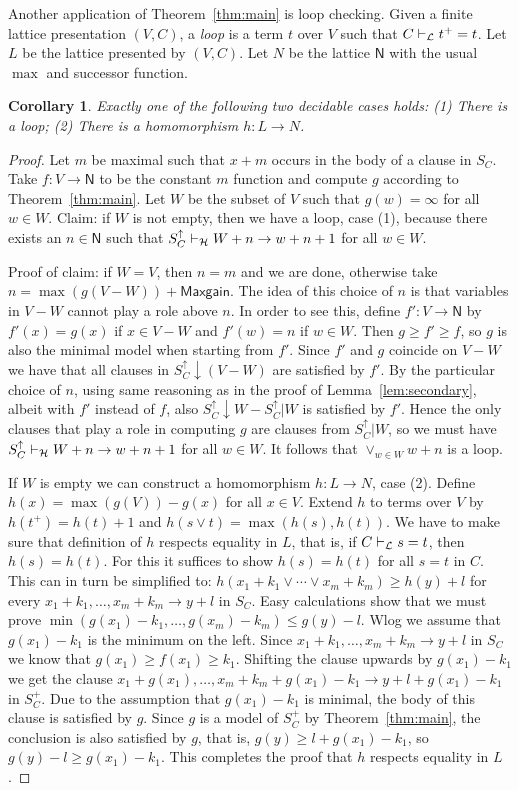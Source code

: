 \documentclass[11pt,a4paper]{article}
\newtheorem{corollary}[theorem]{Corollary}
\newcommand{\N}{\mathsf{N}}
\newcommand\jterm[3]{{{#1_1}+{#2_1}}\vee\cdots\vee{{#1_#3}+{#2_#3}}}
\newcommand\jbody[3]{{{#1_1}+{#2_1}},\ldots,{{#1_#3}+{#2_#3}}}
\newcommand\lathy{{\cal L}}
\newcommand\prvL{\vdash_{\lathy}}
\newcommand\prvH{\vdash_{\cal H}}
\newcommand\M{\mathsf{Maxgain}}
\begin{document}
Another application of Theorem~\ref{thm:main} is loop checking.
Given a finite lattice presentation $(V,C)$, a \emph{loop} is a 
term $t$ over $V$ such that $C\prvL t^+=t$. Let $L$ be the
lattice presented by $(V,C)$. Let $N$ be the lattice $\N$ with
the usual $\max$ and successor function.

\begin{corollary}\label{cor:loopchecking}
Exactly one of the following two decidable cases holds:
(1) There is a loop;
(2) There is a homomorphism $h: L\to N$.
\end{corollary}
\begin{proof}
Let $m$ be maximal such that $x+m$ occurs in the body of a clause in $S_C$.
Take $f: V\to\N$ to be the constant $m$ function and compute $g$ according
to Theorem~\ref{thm:main}. Let $W$ be the subset of $V$ such that 
$g(w)=\infty$ for all $w\in W$. Claim: if $W$ is not empty,
then we have a loop, case (1), because there exists an $n\in\N$ such that 
$S^\uparrow_C\prvH W+n \to w+n+1$ for all $w\in W$.

Proof of claim: if $W=V$, then $n=m$ and we are done,
otherwise take $n= \max(g(V-W))+\M$. The idea of this choice of $n$ is 
that variables in $V-W$ cannot play a role above $n$.
In order to see this, define $f': V\to\N$ by $f'(x)=g(x)$ if $x\in V-W$
and $f'(w)=n$ if $w\in W$. Then $g\geq f'\geq f$, so $g$ is also the minimal 
model when starting from $f'$. Since $f'$ and $g$ coincide on $V-W$ we have
that all clauses in $S^\uparrow_C{\downarrow}(V-W)$ are satisfied by $f'$.
By the particular choice of $n$, using same reasoning as in the proof of 
Lemma~\ref{lem:secondary}, albeit with $f'$ instead of $f$, also
$S^\uparrow_C{\downarrow}W - S^\uparrow_C|W$ is satisfied by $f'$.
Hence the only clauses that play a role in computing $g$ are
clauses from $S^\uparrow_C|W$, so we must have 
$S^\uparrow_C\prvH W+n \to w+n+1$ for all $w\in W$.
It follows that $\vee_{w\in W} w+n$ is a loop.

If $W$ is empty we can construct a homomorphism $h: L\to N$, case (2).
Define $h(x) = \max(g(V))- g(x)$ for all $x\in V$. 
Extend $h$ to terms over $V$ by $h(t^+) = h(t)+1$ 
and $h(s\vee t) = \max(h(s),h(t))$.
We have to make sure that definition of $h$ respects
equality in $L$, that is, if $C\prvL s=t$, then $h(s)=h(t)$.
For this it suffices to show $h(s)=h(t)$ for all $s=t$ in $C$.
This can in turn be simplified to: $h(\jterm{x}{k}{m}) \geq h(y)+l$ 
for every $\jbody{x}{k}{m} \to y+l$ in $S_C$.
Easy calculations show that we must prove
$\min(g(x_1)-k_1,\ldots,g(x_m)-k_m) \leq g(y)-l$.
Wlog we assume that $g(x_1)-k_1$ is the minimum on the left.
Since $\jbody{x}{k}{m} \to y+l$ in $S_C$ we know 
that $g(x_1)\geq f(x_1)\geq k_1$. Shifting the clause
upwards by $g(x_1)-k_1$ we get the clause
$x_1+g(x_1),\ldots,x_m+k_m+g(x_1)-k_1 \to y+l+g(x_1)-k_1$
in $S_C^+$. Due to the assumption that $g(x_1)-k_1$ is minimal,
the body of this clause is satisfied by $g$.
Since $g$ is a model of $S_C^+$ by Theorem~\ref{thm:main},
the conclusion is also satisfied by $g$, that is,
$g(y)\geq l+g(x_1)-k_1$, so $g(y)-l\geq g(x_1)-k_1$.
This completes the proof that $h$ respects equality in $L$.


\end{proof}
\end{document}
